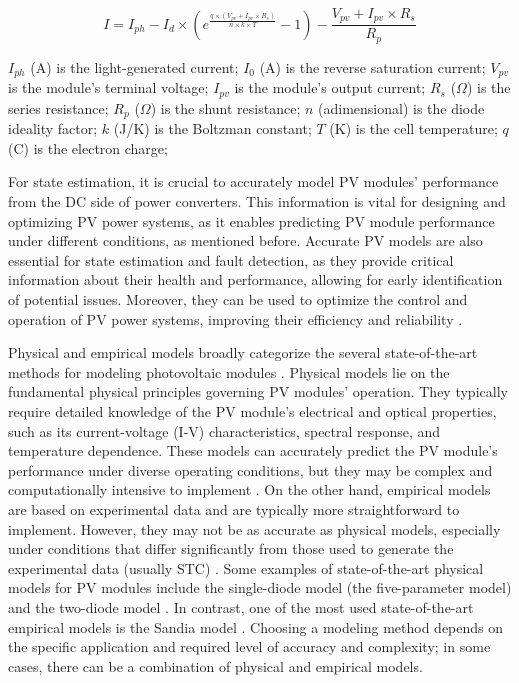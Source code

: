 \begin{equation} \label{eq:iv}
    I = I_{ph} - I_d \times (e^{\frac{q \times (V_{pv} + I_{pv} \times R_{s})}{n \times k \times T}} - 1) - \frac{V_{pv} + I_{pv} \times R_s}{R_p}
\end{equation}

$I_{ph}$ (A) is the light-generated current;
$I_{0}$ (A) is the reverse saturation current;
$V_{pv}$ is the module's terminal voltage;
$I_{pv}$ is the module's output current;
$R_{s}$ ($\Omega$) is the series resistance;
$R_{p}$ ($\Omega$) is the shunt resistance;
$n$ (adimensional) is the diode ideality factor;
$k$ (J/K) is the Boltzman constant;
$T$ (K) is the cell temperature;
$q$ (C) is the electron charge;

For state estimation, it is crucial to accurately model PV modules' performance from the DC side of power converters. This information is vital for designing and optimizing PV power systems, as it enables predicting PV module performance under different conditions, as mentioned before. Accurate PV models are also essential for state estimation and fault detection, as they provide critical information about their health and performance, allowing for early identification of potential issues. Moreover, they can be used to optimize the control and operation of PV power systems, improving their efficiency and reliability \cite{Braun2011}.

Physical and empirical models broadly categorize the several state-of-the-art methods for modeling photovoltaic modules \cite{Braun2011}. Physical models lie on the fundamental physical principles governing PV modules' operation. They typically require detailed knowledge of the PV module's electrical and optical properties, such as its current-voltage (I-V) characteristics, spectral response, and temperature dependence. These models can accurately predict the PV module's performance under diverse operating conditions, but they may be complex and computationally intensive to implement \cite{Kumar2019}. On the other hand, empirical models are based on experimental data and are typically more straightforward to implement. However, they may not be as accurate as physical models, especially under conditions that differ significantly from those used to generate the experimental data (usually STC) \cite{Braun2011}. Some examples of state-of-the-art physical models for PV modules include the single-diode model (the five-parameter model) and the two-diode model \cite{Godina2017}. In contrast, one of the most used state-of-the-art empirical models is the Sandia model \cite{Braun2011}. Choosing a modeling method depends on the specific application and required level of accuracy and complexity; in some cases, there can be a combination of physical and empirical models.

